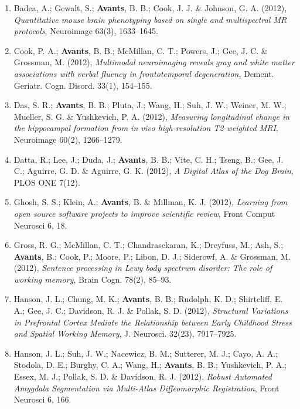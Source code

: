 \documentclass[11pt]{moderncv} %
\begin{document}
\begin{enumerate}
\item  Badea, A.; Gewalt, S.; \textbf{Avants}, B. B.; Cook, J. J. \&  Johnson, G. A. (2012), \textit{Quantitative mouse brain phenotyping based on single and multispectral MR protocols}, Neuroimage 63(3), 1633--1645.

\item  Cook, P. A.; \textbf{Avants}, B. B.; McMillan, C. T.; Powers, J.; Gee, J. C. \&  Grossman, M. (2012), \textit{Multimodal neuroimaging reveals gray and white matter associations with verbal fluency in frontotemporal degeneration}, Dement. Geriatr. Cogn. Disord. 33(1), 154--155.

\item  Das, S. R.; \textbf{Avants}, B. B.; Pluta, J.; Wang, H.; Suh, J. W.; Weiner, M. W.; Mueller, S. G. \&  Yushkevich, P. A. (2012), \textit{Measuring longitudinal change in the hippocampal formation from in vivo high-resolution T2-weighted MRI}, Neuroimage 60(2), 1266--1279.

\item  Datta, R.; Lee, J.; Duda, J.; \textbf{Avants}, B. B.; Vite, C. H.; Tseng, B.; Gee, J. C.; Aguirre, G. D. \&  Aguirre, G. K. (2012), \textit{A Digital Atlas of the Dog Brain}, PLOS ONE 7(12).

\item  Ghosh, S. S.; Klein, A.; \textbf{Avants}, B. \&  Millman, K. J. (2012), \textit{Learning from open source software projects to improve scientific review}, Front Comput Neurosci 6, 18.

\item  Gross, R. G.; McMillan, C. T.; Chandrasekaran, K.; Dreyfuss, M.; Ash, S.; \textbf{Avants}, B.; Cook, P.; Moore, P.; Libon, D. J.; Siderowf, A. \&  Grossman, M. (2012), \textit{Sentence processing in Lewy body spectrum disorder: The role of working memory}, Brain Cogn. 78(2), 85--93.

\item  Hanson, J. L.; Chung, M. K.; \textbf{Avants}, B. B.; Rudolph, K. D.; Shirtcliff, E. A.; Gee, J. C.; Davidson, R. J. \&  Pollak, S. D. (2012), \textit{Structural Variations in Prefrontal Cortex Mediate the Relationship between Early Childhood Stress and Spatial Working Memory}, J. Neurosci. 32(23), 7917--7925.

\item  Hanson, J. L.; Suh, J. W.; Nacewicz, B. M.; Sutterer, M. J.; Cayo, A. A.; Stodola, D. E.; Burghy, C. A.; Wang, H.; \textbf{Avants}, B. B.; Yushkevich, P. A.; Essex, M. J.; Pollak, S. D. \&  Davidson, R. J. (2012), \textit{Robust Automated Amygdala Segmentation via Multi-Atlas Diffeomorphic Registration}, Front Neurosci 6, 166.


\end{enumerate}
\end{document}
